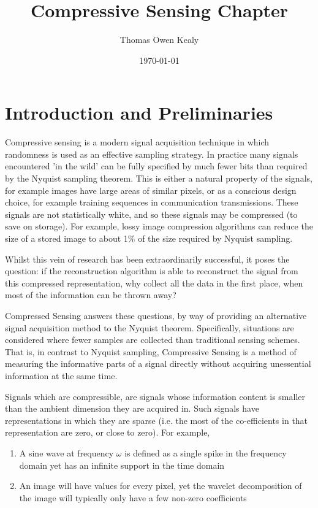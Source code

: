 \documentclass[12pt]{report}
\title{Compressive Sensing Chapter}
\author{Thomas Owen Kealy}
\date{\today}
\begin{document}
\maketitle

\tableofcontents

\section{Introduction and Preliminaries}  \label{sec:intro}

Compressive sensing is a modern signal acquisition technique in which randomness is used as an effective sampling strategy. In practice many signals encountered 'in the wild' can be fully specified by much fewer bits than required by the Nyquist sampling theorem. This is either a natural property of the signals, for example images have large areas of similar pixels, or as a conscious design choice, for example training sequences in communication transmissions. These signals are not statistically white, and so these signals may be compressed (to save on storage). For example, lossy image compression algorithms can reduce the size of a stored image to about 1\% of the size required by Nyquist sampling. 

Whilst this vein of research has been extraordinarily successful, it poses the question: if the reconstruction algorithm is able to reconstruct the signal from this compressed representation, why collect all the data in the first place, when most of the information can be thrown away? 

Compressed Sensing answers these questions, by way of providing an alternative signal acquisition method to the Nyquist theorem. Specifically, situations are considered where fewer samples are collected than traditional sensing schemes. That is, in contrast to Nyquist sampling, Compressive Sensing is a method of measuring the informative parts of a signal directly without acquiring unessential information at the same time. 

Signals which are compressible, are signals whose information content is smaller than the ambient dimension they are acquired in. Such signals have representations in which they are sparse (i.e. the most of the co-efficients in that representation are zero, or close to zero). For example, 

\begin{enumerate}
\item  A sine wave at frequency \(\omega\) is defined as a single spike in the frequency domain yet has an infinite support in the time domain
\item An image will have values for every pixel, yet the wavelet decomposition of the image will typically only have a few non-zero coefficients
\end{enumerate} 
\end{document}
